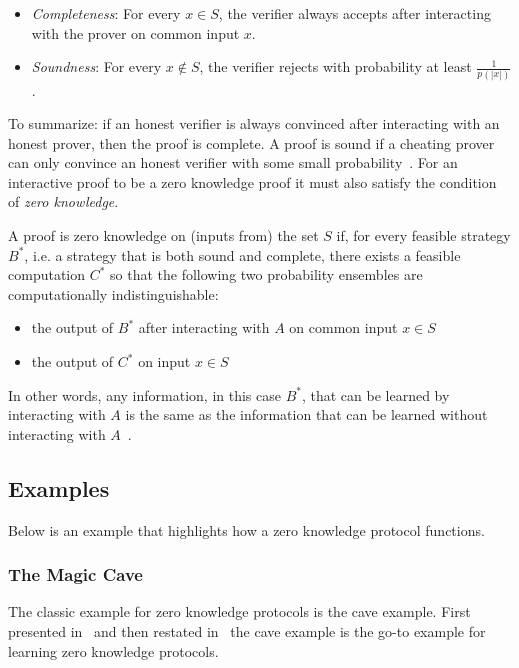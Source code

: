 \documentclass{sig-alternate}
\begin{document}
	\begin{itemize}
		\item \textit{Completeness}: For every $ x \in S$, the verifier always
		accepts after interacting with the prover on common input $x$.
			
		\item \textit{Soundness}: For every $x \notin S$, the verifier		
		rejects with probability at least $\frac{1}{p(|x|)}$.
	\end{itemize}
				
	To summarize: if an honest verifier is always convinced after interacting with
	an honest prover, then the proof is complete. A proof is sound if a cheating
	prover can only convince an honest verifier with some small probability~\cite{Survey}.	
	For an interactive proof to be a zero knowledge proof it must also
	satisfy the condition of \textit{zero knowledge}.	
		
	A proof is zero knowledge on (inputs from) the set $S$ if, for every feasible
	strategy $B^{*}$, i.e. a strategy that is both sound and complete,
	there exists a feasible computation $C^{*}$ so that the
	following two probability ensembles are computationally indistinguishable:
			
	\begin{itemize}
		\item the output of $B^{*}$ after interacting with $A$ on common input
		$x \in S$
				
		\item the output of $C^{*}$ on input $x \in S$
	\end{itemize}						
			
	In other words, any information, in this case $B^{*}$, that can be learned by
	interacting with $A$ is the same as the information that can be learned 
	without interacting with $A$~\cite{Survey}.

	\subsection{Examples}
	
	Below is an
	example that highlights how a zero knowledge
	protocol functions.
	
	\subsubsection{The Magic Cave}
	The classic example for zero knowledge protocols is the cave example.
	First presented in~\cite{Children:1987} and then restated
	in~\cite{Survey} the cave example is the go-to example for learning
	zero knowledge protocols.
\end{document}
